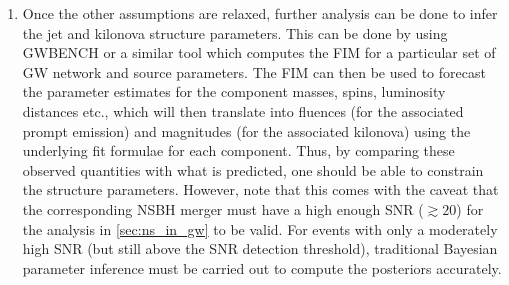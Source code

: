 \begin{enumerate}
            \item Once the other assumptions are relaxed, further analysis can be done
                to infer the jet and kilonova structure parameters. This can be done by
                using GWBENCH or a similar tool which computes the FIM for a particular
                set of GW network and source parameters. The FIM can then be used to
                forecast the parameter estimates for the component masses, spins,
                luminosity distances etc., which will then translate into fluences (for
                the associated prompt emission) and magnitudes (for the associated
                kilonova) using the underlying fit formulae for each component. Thus, by
                comparing these observed quantities with what is predicted, one should
                be able to constrain the structure parameters. However, note that this
                comes with the caveat that the corresponding NSBH merger must have a
                high enough SNR ($\gtrsim 20$) for the analysis in \ref{sec:ns_in_gw} to
                be valid. For events with only a moderately high SNR (but still above
                the SNR detection threshold), traditional Bayesian parameter inference
                must be carried out to compute the posteriors accurately.

        \end{enumerate}
